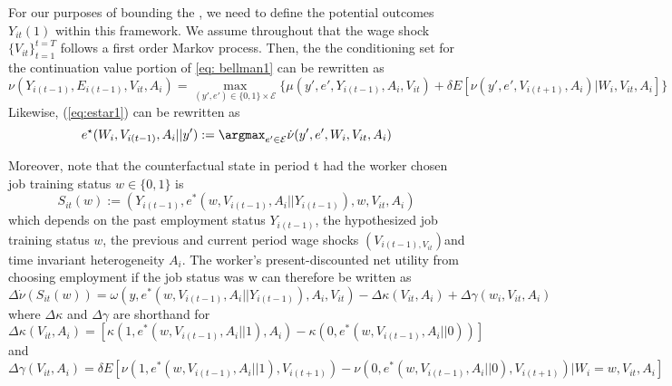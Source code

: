 \documentclass[uplatex,dvipdfmx]{jsarticle}
\begin{document}
For our purposes of bounding the , we need to define the potential outcomes $Y_{it}(1)$ within this framework. We assume throughout that the wage shock $\{V_{it}\}_{t=1}^{t=T}$ follows a first order Markov process.
Then, the the conditioning set for the continuation value portion of \ref{eq: bellman1} can be rewritten as
\begin{equation}
\nu(Y_{i(t-1)}, E_{i(t-1)}, V_{it}, A_i) = \max_{(y', e') \in \{0,1\} \times \mathcal{E}} \{ \mu(y', e', Y_{i(t-1)},A_i, V_{it} )  + \delta E[ \nu(y', e', V_{i(t+1)}, A_i) | W_i, V_{it}, A_i ] \} 
\end{equation}
Likewise, (\ref{eq:estar1}) can be rewritten as 
\begin{equation}
    \label{eq:estar2}
    e^ \star  (W_i,V_{i(t-1)}, A_i  || y' ) : = \argmax _ { e' \in \mathcal{ E} } \dot{ \nu} ( y', e', W_i, V_{it}, A_ i ) 
\end{equation}




Moreover, note that the counterfactual state in period t had the worker chosen job training status $w \in \{0,1\}$ is 
\begin{equation}
    S_{it}(w) := ( Y_{i(t-1)}, e^*( w, V_{i(t-1)}, A_i || Y_{i(t-1)}), w, V_{it}, A_i)
\end{equation}
which depends on the past employment status $Y_{i(t-1)}$, the hypothesized job training status $w$, the previous and current period wage shocks $( V_{i(t-1), V_{it}})$and time invariant heterogeneity $A_i$.
The worker's present-discounted net utility from choosing employment if the job status  was w can therefore be written as
\begin{equation}
    \Delta \dot{\nu}( S_{it}(w)) = \omega ( y, e^*( w, V_{i(t-1)}, A_i || Y_{i(t-1)}), A_i, V_{it} ) - \Delta \kappa ( V_{it}, A_i) + \Delta \gamma(w_i,V_{it}, A_i)
\end{equation}
where $\Delta \kappa $ and $\Delta \gamma $ are shorthand for 
\begin{equation*}
    \Delta \kappa( V_{it},A_i) = [ \kappa ( 1, e^*( w, V_{i(t-1)}, A_i || 1), A_i) - \kappa ( 0, e^*( w, V_{i(t-1)}, A_i || 0))]
\end{equation*}
and
\begin{equation*}
    \Delta \gamma( V_{it}, A_i ) = \delta E [ \nu(1, e^*( w, V_{i(t-1)}, A_i || 1), V_{i(t+1)})  - \nu(0, e^*( w, V_{i(t-1)}, A_i || 0), V_{i(t+1)}) | W_i = w ,V_{it}, A_i]
\end{equation*}
\end{document}
